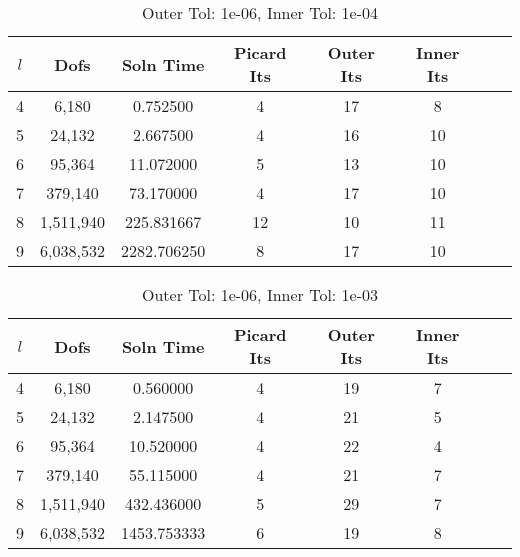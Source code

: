 \documentclass{article}
\begin{document}
\begin{table}[h!] \small
\begin{center}
\begin{tabular}{cccccccc}
\hline
$l$ &    Dofs & Soln Time & Picard Its & Outer Its & Inner Its \\
\hline
4 &     6,180 &     0.752500 &                  4 &         17 &          8 \\
 5 &    24,132 &     2.667500 &                  4 &         16 &         10 \\
 6 &    95,364 &    11.072000 &                  5 &         13 &         10 \\
 7 &   379,140 &    73.170000 &                  4 &         17 &         10 \\
 8 &  1,511,940 &   225.831667 &                 12 &         10 &         11 \\
 9 &  6,038,532 &  2282.706250 &                  8 &         17 &         10 \\
\hline
\end{tabular}
\caption{Outer Tol:   1e-06,       Inner Tol:    1e-04}

\end{center}
\end{table}



\begin{table}[h!] \small
\begin{center}
\begin{tabular}{cccccccc}
\hline
$l$ &    Dofs & Soln Time & Picard Its & Outer Its & Inner Its \\
\hline
4 &     6,180 &     0.560000 &                  4 &         19 &          7 \\
5 &    24,132 &     2.147500 &                  4 &         21 &          5 \\
6 &    95,364 &    10.520000 &                  4 &         22 &          4 \\
7 &   379,140 &    55.115000 &                  4 &         21 &          7 \\
8 &  1,511,940 &   432.436000 &                  5 &         29 &          7 \\
9 &  6,038,532 &  1453.753333 &                  6 &         19 &          8 \\
\hline
\end{tabular}
\caption{Outer Tol:   1e-06,       Inner Tol:    1e-03}

\end{center}
\end{table}
\end{document}
